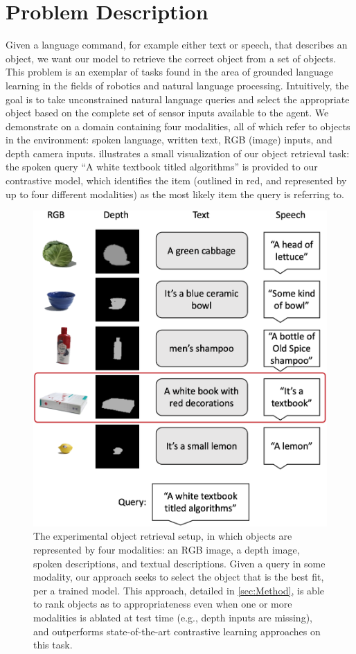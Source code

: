 \documentclass[10pt]{article} %
\begin{document}
\section{Problem Description}
\label{sec:Problem-Description}

Given a language command, for example either text or speech, that describes an object, we want our model to retrieve the correct object from a set of objects. This problem is an exemplar of tasks found in the area of grounded language learning in the fields of robotics and natural  language processing. Intuitively, the goal is to take unconstrained natural language queries and select the appropriate object based on the complete set of sensor inputs available to the agent. We demonstrate on a domain containing four modalities, all of which refer to objects in the environment: spoken language, written text, RGB (image) inputs, and depth camera inputs.  illustrates a small visualization of our object retrieval task: the spoken query ``A white textbook titled algorithms'' is provided to our contrastive model, which identifies the item (outlined in red, and represented by up to four different modalities) as the most likely item the query is referring to.

\begin{figure}[tb]
\centering
\includegraphics[width=.5\columnwidth]{Figures/experiment-setup.png}
\caption{
The experimental object retrieval setup, in which objects are represented by four modalities: an RGB image, a depth image, spoken descriptions, and textual descriptions. Given a query in some modality, our approach seeks to select the object that is the best fit, per a trained model. This approach, detailed in \cref{sec:Method}, is able to rank objects as to appropriateness even when one or more modalities is ablated at test time (e.g., depth inputs are missing), and outperforms state-of-the-art contrastive learning approaches on this task.
}
\label{fig:experimental-setup}
\end{figure}
\end{document}
